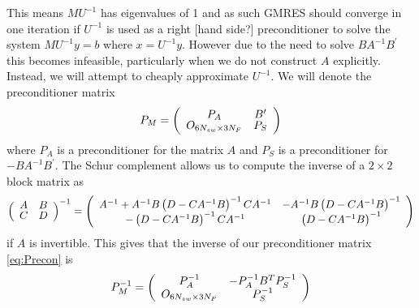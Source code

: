 This means $MU^{-1}$ has eigenvalues of 1 and as such GMRES should converge in one iteration \cite{Rostami2019FastBiofluids} if $U^{-1}$ is used as a right [hand side?] preconditioner to solve the system $MU^{-1}y = b$ where $x = U^{-1}y$. However due to the need to solve $BA^{-1}B^\prime$ this becomes infeasible, particularly when we do not construct $A$ explicitly.  Instead, we will attempt to cheaply approximate $U^{-1}$. We will denote the preconditioner matrix 
\begin{equation}
\def\arraystretch{0.8}
    P_M = \left(\begin{array}{cc}
        P_A & B^\prime \\
        O_{6N_{sw}\times3N_F} & P_S
    \end{array}\right)
    \label{eq:Precon}
\end{equation}
where $P_A$ is a preconditioner for the matrix $A$ and $P_S$ is a preconditioner for $-BA^{-1}B^\prime$. The Schur complement \cite{Zhang2005TheApplications,Lu2002InversesMatrices} allows us to compute the inverse of a $2 \times 2$ block matrix as 
\begin{equation*}
\def\arraystretch{0.8}
    \left(\begin{array}{cc}
        A & B \\
        C & D
    \end{array}\right)^{-1} = \left(\begin{array}{cc}
A^{-1}+A^{-1} B\left(D-C A^{-1} B\right)^{-1} C A^{-1} & -A^{-1} B\left(D-C A^{-1} B\right)^{-1} \\
-\left(D-C A^{-1} B\right)^{-1} C A^{-1} & \left(D-C A^{-1} B\right)^{-1}
\end{array}\right) 
\end{equation*}
if $A$ is invertible. This gives that the inverse of our preconditioner matrix \cref{eq:Precon} is
\begin{equation*}
\def\arraystretch{0.8}
        P_M^{-1} = \left(\begin{array}{cc}
        P_A^{-1} & -P_A^{-1} B^T P_S^{-1} \\
        O_{6N_{sw}\times3N_F} & P_S^{-1}
    \end{array}\right)
\end{equation*}

